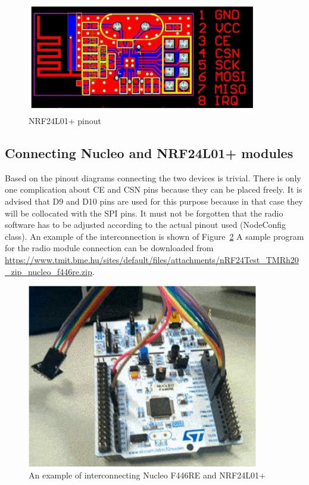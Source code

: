 \documentclass[a4paper]{article}
\begin{document}
\begin{figure}[H]
    \centering
    \includegraphics[width=0.9\textwidth]{figures/radio-pinout.png}
    \caption{NRF24L01+ pinout}
    \label{fig:radio-pinout}
\end{figure}

\subsection{Connecting Nucleo and NRF24L01+ modules}

Based on the pinout diagrams connecting the two devices is trivial. There is only one complication about CE and CSN pins because they can be placed freely. It is advised that D9 and D10 pins are used for this purpose because in that case they will be collocated with the SPI pins. It must not be forgotten that the radio software has to be adjusted according to the actual pinout used (NodeConfig class). An example of the interconnection is shown of Figure~\ref{fig:radio-nucleo-connection}
A sample program for the radio module connection can be downloaded from \url{https://www.tmit.bme.hu/sites/default/files/attachments/nRF24Test_TMRh20_zip_nucleo_f446re.zip}.

\begin{figure}[H]
    \centering
    \includegraphics[width=0.9\textwidth]{figures/board-radio-example.png}
    \caption{An example of interconnecting Nucleo F446RE and NRF24L01+}
    \label{fig:radio-nucleo-connection}
\end{figure}
\end{document}
